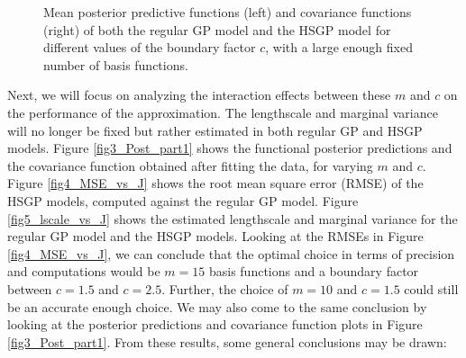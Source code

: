 \documentclass[]{interact}
\theoremstyle{plain}%
\theoremstyle{definition}
\theoremstyle{remark}
\begin{document}
\begin{figure}
\caption{Mean posterior predictive functions (left) and covariance functions (right) of both the regular GP model and the HSGP model for different values of the boundary factor $c$, with a large enough fixed number of basis functions.}
  \label{fig2_Post_L}
\end{figure}

Next, we will focus on analyzing the interaction effects between these $m$ and $c$ on the performance of the approximation. The lengthscale and marginal variance will no longer be fixed but rather estimated in both regular GP and HSGP models. Figure \ref{fig3_Post_part1} shows the functional posterior predictions and the covariance function obtained after fitting the data, for varying $m$ and $c$. Figure \ref{fig4_MSE_vs_J} shows the root mean square error (RMSE) of the HSGP models, computed against the regular GP model. Figure \ref{fig5_lscale_vs_J} shows the estimated lengthscale and marginal variance for the regular GP model and the HSGP models. Looking at the RMSEs in Figure \ref{fig4_MSE_vs_J}, we can conclude that the optimal choice in terms of precision and computations would be $m = 15$ basis functions and a boundary factor between $c = 1.5$ and $c = 2.5$. Further, the choice of $m = 10$ and $c = 1.5$ could still be an accurate enough choice. We may also come to the same conclusion by looking at the posterior predictions and covariance function plots in Figure \ref{fig3_Post_part1}. From these results, some general conclusions may be drawn:
\end{document}
